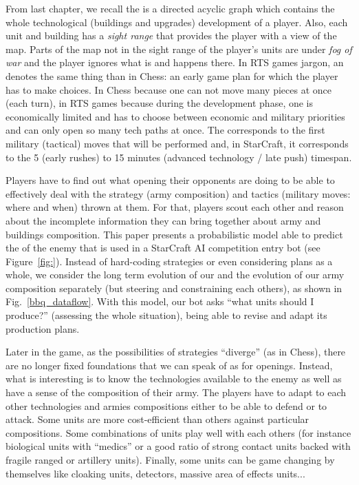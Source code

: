 From last chapter, we recall the \textit{} is a directed acyclic graph which contains the whole technological (buildings and upgrades) development of a player. Also, each unit and building has a \textit{sight range} that provides the player with a view of the map. Parts of the map not in the sight range of the player's units are under \textit{fog of war} and the player ignores what is and happens there. In RTS games jargon, an \textit{} denotes the same thing than in Chess: an early game plan for which the player has to make choices. In Chess because one can not move many pieces at once (each turn), in RTS games because during the development phase, one is economically limited and has to choose between economic and military priorities and can only open so many tech paths at once. The  corresponds to the first military (tactical) moves that will be performed and, in StarCraft, it corresponds to the 5 (early rushes) to 15 minutes (advanced technology / late push) timespan. 

Players have to find out what opening their opponents are doing to be able to effectively deal with the strategy (army composition) and tactics (military moves: where and when) thrown at them. For that, players scout each other and reason about the incomplete information they can bring together about army and buildings composition. This paper presents a probabilistic model able to predict the \textit{} of the enemy that is used in a StarCraft AI competition entry bot (see Figure~\ref{fig:}). Instead of hard-coding strategies or even considering plans as a whole, we consider the long term evolution of our  and the evolution of our army composition separately (but steering and constraining each others), as shown in Fig.~\ref{bbq_dataflow}. With this model, our bot asks ``what units should I produce?'' (assessing the whole situation), being able to revise and adapt its production plans.

Later in the game, as the possibilities of strategies ``diverge'' (as in Chess), there are no longer fixed foundations that we can speak of as for openings. Instead, what is interesting is to know the technologies available to the enemy as well as have a sense of the composition of their army. The players have to adapt to each other technologies and armies compositions either to be able to defend or to attack. Some units are more cost-efficient than others against particular compositions. Some combinations of units play well with each others (for instance biological units with ``medics'' or a good ratio of strong contact units backed with fragile ranged or artillery units). Finally, some units can be game changing by themselves like cloaking units, detectors, massive area of effects units... 


